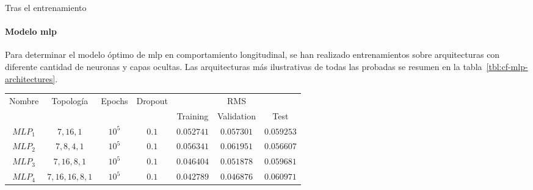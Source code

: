 Tras el entrenamiento



\paragraph{Modelo \ac{mlp}}

Para determinar el modelo óptimo de \ac{mlp} en comportamiento longitudinal, se han realizado entrenamientos sobre arquitecturas con diferente cantidad de neuronas y capas ocultas. Las arquitecturas más ilustrativas de todas las probadas se resumen en la tabla~\ref{tbl:cf-mlp-architectures}.

\begin{table*}
	\caption[Resumen de las arquitecturas \ac{mlp} para el modelo longitudinal]{Resumen de las arquitecturas de \ac{mlp} para el modelo longitudinal. La posición de cada número de la topología indica la capa, siendo su valor el número de nodos (neuronas) que incluye dicha capa. Las arquitecturas seleccionadas en esta tabla son aquellas consideradas relevantes tras un proceso manual de ensayo y error.}
	\label{tbl:cf-mlp-architectures}
	\begin{tabular}{ccccccc}
		\hline
		\multirow{2}{*}{Nombre} & \multirow{2}{*}{Topología} & \multirow{2}{*}{Epochs} & \multirow{2}{*}{Dropout} & \multicolumn{3}{c}{RMS}      \\
		&                            &                         &                          & Training & Validation & Test \\ \hline
		$MLP_1$ & $7, 16, 1$                 & $10^5$                  & $0.1$                    & $0.052741$      & $0.057301$        & $0.059253$  \\
		$MLP_2$ & $7, 8, 4, 1$               & $10^5$                  & $0.1$                    & $0.056341$      & $0.061951$        & $0.056607$  \\
		$MLP_3$ & $7, 16, 8, 1$              & $10^5$                  & $0.1$                    & $0.046404$      & $0.051878$        & $0.059681$  \\
		$MLP_4$ & $7, 16, 16, 8, 1$          & $10^5$                  & $0.1$                    & $0.042789$      & $0.046876$        & $0.060971$  \\ \hline
	\end{tabular}
\end{table*}

